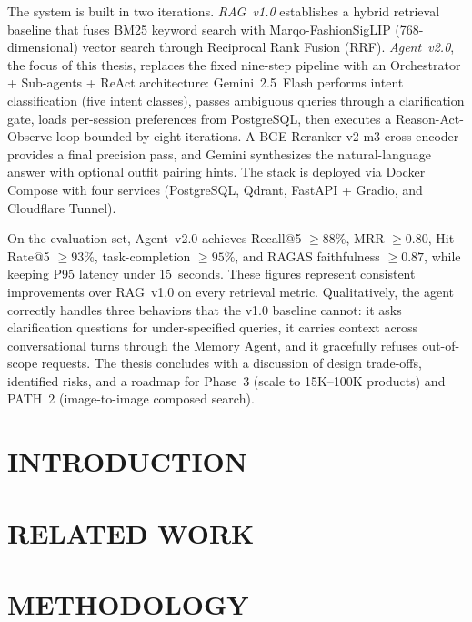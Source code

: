 \documentclass[12pt, twoside]{report}
\begin{document}
The system is built in two iterations. \textit{RAG~v1.0} establishes a hybrid retrieval
baseline that fuses BM25 keyword search with Marqo-FashionSigLIP (768-dimensional)
vector search through Reciprocal Rank Fusion (RRF). \textit{Agent~v2.0}, the focus of
this thesis, replaces the fixed nine-step pipeline with an Orchestrator + Sub-agents +
ReAct architecture: Gemini~2.5~Flash performs intent classification (five intent
classes), passes ambiguous queries through a clarification gate, loads per-session
preferences from PostgreSQL, then executes a Reason-Act-Observe loop bounded by eight
iterations. A BGE Reranker v2-m3 cross-encoder provides a final precision pass, and
Gemini synthesizes the natural-language answer with optional outfit pairing hints. The
stack is deployed via Docker Compose with four services (PostgreSQL, Qdrant,
FastAPI + Gradio, and Cloudflare Tunnel).

On the evaluation set, Agent~v2.0 achieves Recall@5 $\geq 88\%$, MRR $\geq 0.80$,
Hit-Rate@5 $\geq 93\%$, task-completion $\geq 95\%$, and RAGAS faithfulness
$\geq 0.87$, while keeping P95 latency under 15~seconds. These figures represent
consistent improvements over RAG~v1.0 on every retrieval metric. Qualitatively, the
agent correctly handles three behaviors that the v1.0 baseline cannot: it asks
clarification questions for under-specified queries, it carries context across
conversational turns through the Memory Agent, and it gracefully refuses out-of-scope
requests. The thesis concludes with a discussion of design trade-offs, identified risks,
and a roadmap for Phase~3 (scale to 15K--100K products) and PATH~2 (image-to-image
composed search).

\chapter{INTRODUCTION}
\setcounter{page}{1}


\chapter{RELATED WORK}


\chapter{METHODOLOGY}

\end{document}

